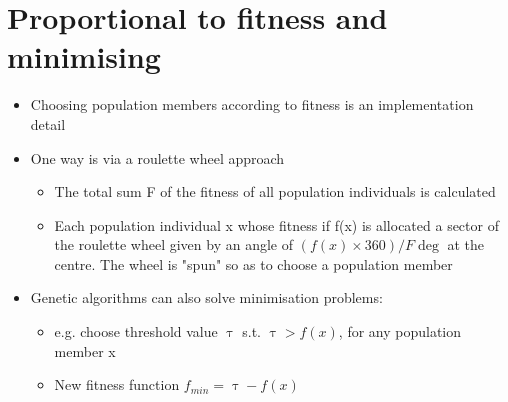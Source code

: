 \documentclass{article}[18pt]
\begin{document}
\section{Proportional to fitness and minimising}
\begin{itemize}
	\item Choosing population members according to fitness is an implementation detail
	\item One way is via a roulette wheel approach
	\begin{itemize}
		\item The total sum F of the fitness of all population individuals is calculated
		\item Each population individual x whose fitness if f(x) is allocated a sector of the roulette wheel given by an angle of $(f(x)\times 360)/ F \deg$ at the centre. The wheel is "spun" so as to choose a population member
	\end{itemize}
	\item Genetic algorithms can also solve minimisation problems:
	\begin{itemize}
		\item e.g. choose threshold value $\uptau$ s.t. $\uptau > f(x)$, for any population member x
		\item New fitness function $f_{min}=\uptau - f(x)$
	\end{itemize}
\end{itemize}
\end{document}
